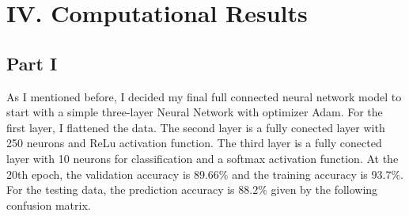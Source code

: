 \documentclass[12pt,letterpaper]{article}
\begin{document}
\section*{IV. Computational Results}

\subsection*{Part I}
As I mentioned before, I decided my final full connected neural network model to start with a simple three-layer Neural Network with optimizer Adam. For the first layer, I flattened the data. The second layer is a fully conected layer with 250 neurons and ReLu activation function. The third layer is a fully conected layer with 10 neurons for classification and a softmax activation function. At the 20th epoch, the validation accuracy is $89.66\%$ and the training accuracy is $93.7\%$.  For the testing data, the prediction accuracy is $88.2\%$ given by the following confusion matrix. 
\end{document}
